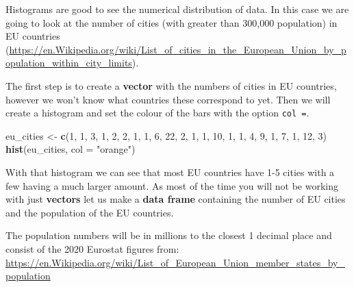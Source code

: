 \documentclass[]{book}
\newenvironment{Shaded}{\begin{snugshade}}{\end{snugshade}}
\newcommand{\KeywordTok}[1]{\textcolor[rgb]{0.13,0.29,0.53}{\textbf{#1}}}
\newcommand{\DataTypeTok}[1]{\textcolor[rgb]{0.13,0.29,0.53}{#1}}
\newcommand{\DecValTok}[1]{\textcolor[rgb]{0.00,0.00,0.81}{#1}}
\newcommand{\StringTok}[1]{\textcolor[rgb]{0.31,0.60,0.02}{#1}}
\newcommand{\NormalTok}[1]{#1}
\begin{document}
Histograms are good to see the numerical distribution of data. In this
case we are going to look at the number of cities (with greater than
300,000 population) in EU countries
(\url{https://en.Wikipedia.org/wiki/List_of_cities_in_the_European_Union_by_population_within_city_limits}).

The first step is to create a \textbf{vector} with the numbers of cities
in EU countries, however we won't know what countries these correspond
to yet. Then we will create a histogram and set the colour of the bars
with the option \texttt{col\ =}.

\begin{Shaded}
\begin{Highlighting}[]
\NormalTok{eu_cities <-}\StringTok{ }\KeywordTok{c}\NormalTok{(}\DecValTok{1}\NormalTok{, }\DecValTok{1}\NormalTok{, }\DecValTok{3}\NormalTok{, }\DecValTok{1}\NormalTok{, }\DecValTok{2}\NormalTok{,}
               \DecValTok{2}\NormalTok{, }\DecValTok{1}\NormalTok{, }\DecValTok{1}\NormalTok{, }\DecValTok{6}\NormalTok{, }\DecValTok{22}\NormalTok{,}
               \DecValTok{2}\NormalTok{, }\DecValTok{1}\NormalTok{, }\DecValTok{1}\NormalTok{, }\DecValTok{10}\NormalTok{, }\DecValTok{1}\NormalTok{,}
               \DecValTok{1}\NormalTok{, }\DecValTok{4}\NormalTok{, }\DecValTok{9}\NormalTok{, }\DecValTok{1}\NormalTok{, }\DecValTok{7}\NormalTok{,}
               \DecValTok{1}\NormalTok{, }\DecValTok{12}\NormalTok{, }\DecValTok{3}\NormalTok{)}
\KeywordTok{hist}\NormalTok{(eu_cities, }\DataTypeTok{col =} \StringTok{"orange"}\NormalTok{)}
\end{Highlighting}
\end{Shaded}

With that histogram we can see that most EU countries have 1-5 cities
with a few having a much larger amount. As most of the time you will not
be working with just \textbf{vectors} let us make a \textbf{data frame}
containing the number of EU cities and the population of the EU
countries.

The population numbers will be in millions to the closest 1 decimal
place and consist of the 2020 Eurostat figures from:
\url{https://en.Wikipedia.org/wiki/List_of_European_Union_member_states_by_population}
\end{document}
